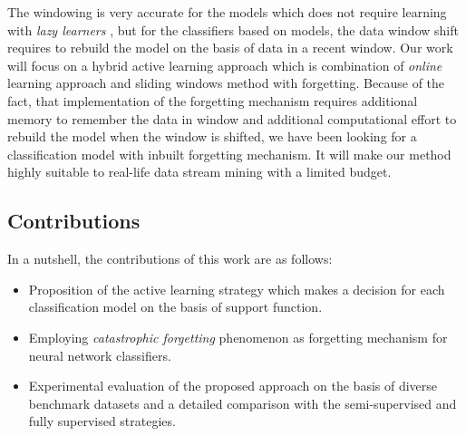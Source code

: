 The windowing is very accurate for the models which does not require learning with \emph{lazy learners} \cite{Aha:1991}, but for the classifiers based on models, the data window shift requires to rebuild the model on the basis of data in a recent window. Our work will focus on a hybrid active learning  approach which is combination of \emph{online} learning approach and sliding windows method with forgetting. Because of the fact, that implementation of the forgetting mechanism requires additional memory to remember the data in window and additional computational effort to rebuild the model when the window is shifted, we have been looking for a classification model with inbuilt forgetting mechanism. It will make our method highly suitable to real-life data stream mining with a limited budget. 



\subsection{Contributions}
\noindent In a nutshell, the contributions of this work are as follows:

\begin{itemize}
\item Proposition of the active learning strategy which makes a decision for each classification model on the basis of support function.
\item Employing \emph{catastrophic forgetting} phenomenon as forgetting mechanism for neural network classifiers.
\item Experimental evaluation of the proposed approach on the basis of diverse benchmark datasets and a detailed comparison with the semi-supervised and fully supervised strategies.
\end{itemize} 

